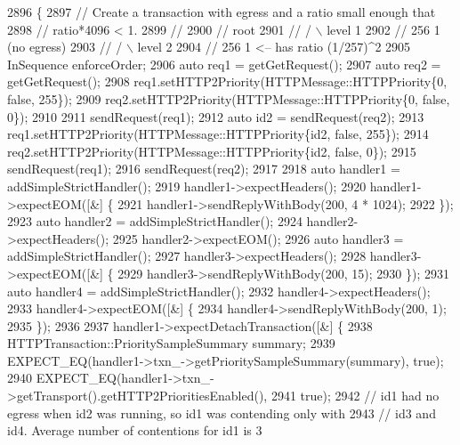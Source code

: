\begin{DoxyCode}
2896                                                                  \{
2897   \textcolor{comment}{// Create a transaction with egress and a ratio small enough that}
2898   \textcolor{comment}{// ratio*4096 < 1.}
2899   \textcolor{comment}{//}
2900   \textcolor{comment}{//     root}
2901   \textcolor{comment}{//     /  \(\backslash\)                                                 level 1}
2902   \textcolor{comment}{//   256   1 (no egress)}
2903   \textcolor{comment}{//        / \(\backslash\)                                               level 2}
2904   \textcolor{comment}{//      256  1  <-- has ratio (1/257)^2}
2905   InSequence enforceOrder;
2906   \textcolor{keyword}{auto} req1 = getGetRequest();
2907   \textcolor{keyword}{auto} req2 = getGetRequest();
2908   req1.setHTTP2Priority(HTTPMessage::HTTPPriority\{0, \textcolor{keyword}{false}, 255\});
2909   req2.setHTTP2Priority(HTTPMessage::HTTPPriority\{0, \textcolor{keyword}{false}, 0\});
2910 
2911   sendRequest(req1);
2912   \textcolor{keyword}{auto} id2 = sendRequest(req2);
2913   req1.setHTTP2Priority(HTTPMessage::HTTPPriority\{id2, \textcolor{keyword}{false}, 255\});
2914   req2.setHTTP2Priority(HTTPMessage::HTTPPriority\{id2, \textcolor{keyword}{false}, 0\});
2915   sendRequest(req1);
2916   sendRequest(req2);
2917 
2918   \textcolor{keyword}{auto} handler1 = addSimpleStrictHandler();
2919   handler1->expectHeaders();
2920   handler1->expectEOM([&] \{
2921       handler1->sendReplyWithBody(200, 4 * 1024);
2922     \});
2923   \textcolor{keyword}{auto} handler2 = addSimpleStrictHandler();
2924   handler2->expectHeaders();
2925   handler2->expectEOM();
2926   \textcolor{keyword}{auto} handler3 = addSimpleStrictHandler();
2927   handler3->expectHeaders();
2928   handler3->expectEOM([&] \{
2929       handler3->sendReplyWithBody(200, 15);
2930     \});
2931   \textcolor{keyword}{auto} handler4 = addSimpleStrictHandler();
2932   handler4->expectHeaders();
2933   handler4->expectEOM([&] \{
2934       handler4->sendReplyWithBody(200, 1);
2935     \});
2936 
2937   handler1->expectDetachTransaction([&] \{
2938       HTTPTransaction::PrioritySampleSummary summary;
2939       EXPECT\_EQ(handler1->txn\_->getPrioritySampleSummary(summary), \textcolor{keyword}{true});
2940       EXPECT\_EQ(handler1->txn\_->getTransport().getHTTP2PrioritiesEnabled(),
2941                 \textcolor{keyword}{true});
2942       \textcolor{comment}{// id1 had no egress when id2 was running, so id1 was contending only with}
2943       \textcolor{comment}{// id3 and id4. Average number of contentions for id1 is 3}

\end{DoxyCode}

